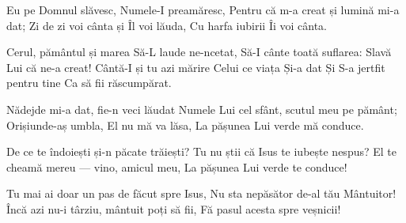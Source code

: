 \beginverse
Eu pe Domnul slăvesc, Numele-I preamăresc,
Pentru că m-a creat și lumină mi-a dat;
Zi de zi voi cânta și Îl voi lăuda,
Cu harfa iubirii Îi voi cânta.
\endverse

\beginchorus
Cerul, pământul și marea
Să-L laude ne-ncetat,
Să-I cânte toată suflarea:
Slavă Lui că ne-a creat!
Cântă-I și tu azi mărire
Celui ce viața Și-a dat
Și S-a jertfit pentru tine
Ca să fii răscumpărat.
\endchorus

\beginverse
Nădejde mi-a dat, fie-n veci lăudat
Numele Lui cel sfânt, scutul meu pe pământ;
Orișiunde-aș umbla, El nu mă va lăsa,
La pășunea Lui verde mă conduce.
\endverse

\beginverse
De ce te îndoiești și-n păcate trăiești?
Tu nu știi că Isus te iubește nespus?
El te cheamă mereu — vino, amicul meu,
La pășunea Lui verde te conduce!
\endverse

\beginverse
Tu mai ai doar un pas de făcut spre Isus,
Nu sta nepăsător de-al tău Mântuitor!
Încă azi nu-i târziu, mântuit poți să fii,
Fă pasul acesta spre veșnicii!
\endverse
\endsong
